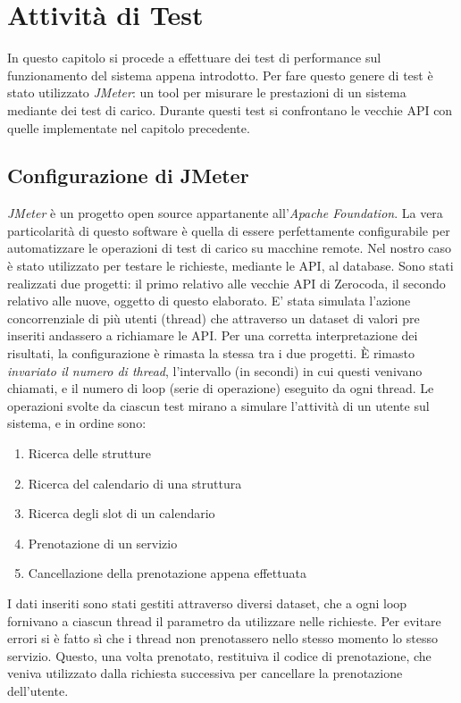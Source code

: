 \chapter{Attività di Test}
\label{chap:testing}
In questo capitolo si procede a effettuare dei test di performance sul funzionamento del sistema appena introdotto. Per fare questo genere di test è stato utilizzato \emph{JMeter}: un tool per misurare le prestazioni di un sistema mediante dei test di carico. Durante questi test si confrontano le vecchie API con quelle implementate nel capitolo precedente.

\section{Configurazione di JMeter}
\emph{JMeter} è un progetto open source appartanente all'\emph{Apache Foundation}. La vera particolarità di questo software è quella di essere perfettamente configurabile per automatizzare le operazioni di test di carico su macchine remote. Nel nostro caso è stato utilizzato per testare le richieste, mediante le API, al database. Sono stati realizzati due progetti: il primo relativo alle vecchie API di Zerocoda, il secondo relativo alle nuove, oggetto di questo elaborato. E' stata simulata l'azione concorrenziale di più utenti (thread) che attraverso un dataset di valori pre inseriti andassero a richiamare le API. Per una corretta interpretazione dei risultati, la configurazione è rimasta la stessa tra i due progetti. È rimasto \textit{invariato il numero di thread}, l'intervallo (in secondi) in cui questi venivano chiamati, e il numero di loop (serie di operazione) eseguito da ogni thread. Le operazioni svolte da ciascun test mirano a simulare l'attività di un utente sul sistema, e in ordine sono:
\begin{enumerate}
    \item Ricerca delle strutture
    \item Ricerca del calendario di una struttura
    \item Ricerca degli slot di un calendario
    \item Prenotazione di un servizio
    \item Cancellazione della prenotazione appena effettuata
\end{enumerate}
I dati inseriti sono stati gestiti attraverso diversi dataset, che a ogni loop fornivano a ciascun thread il parametro da utilizzare nelle richieste. Per evitare errori si è fatto sì che i thread non prenotassero nello stesso momento lo stesso servizio. Questo, una volta prenotato, restituiva il codice di prenotazione, che veniva utilizzato dalla richiesta successiva per cancellare la prenotazione dell'utente.

